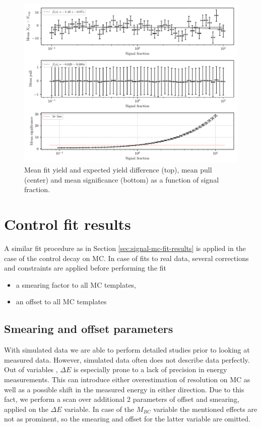 \begin{figure}[H]
	\centering
	\captionsetup{width=0.8\linewidth}
	\includegraphics[width=\linewidth]{fig/lin_test}
	\caption{Mean fit yield and expected yield difference (top), mean pull (center) and mean significance (bottom) as a function of signal fraction.}
	\label{fig:lin_test}
\end{figure}

\section{Control fit results}

A similar fit procedure as in Section \ref{sec:signal-mc-fit-results} is applied in the case of the control decay on MC. In case of fits to real data, several corrections and constraints are applied before performing the fit

\begin{itemize}
\item a smearing factor to all MC templates,
\item an offset to all MC templates
\end{itemize}

\subsection{Smearing and offset parameters}

With simulated data we are able to perform detailed studies prior to looking at measured data. However, simulated data often does not describe data perfectly. Out of variables \vars, $\Delta E$ is especially prone to a lack of precision in energy measurements. This can introduce either overestimation of resolution on MC as well as a possible shift in the measured energy in either direction. Due to this fact, we perform a scan over additional 2 parameters of offset and smearing, applied on the $\Delta E$ variable. In case of the $M_{BC}$ variable the mentioned effects are not as prominent, so the smearing and offset for the latter variable are omitted. 

